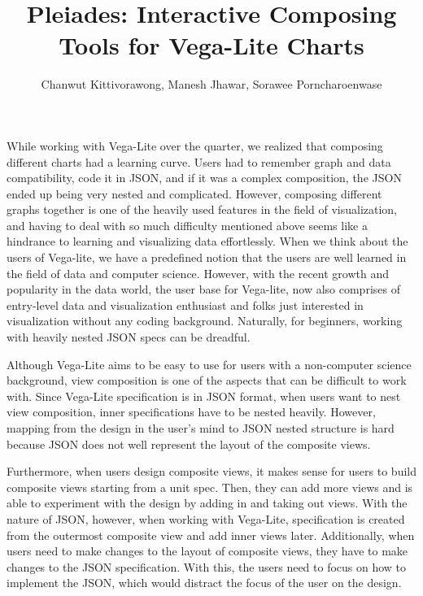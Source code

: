 \documentclass[journal]{vgtc}                %
\title{Pleiades: Interactive Composing Tools for Vega-Lite Charts}
\author{Chanwut Kittivorawong, Manesh Jhawar, Sorawee Porncharoenwase}
\begin{document}


\maketitle

While working with Vega-Lite over the quarter, we realized that composing
different charts had a learning curve. Users had to remember graph and data
compatibility, code it in JSON, and if it was a complex composition, the JSON
ended up being very nested and complicated. However, composing different graphs
together is one of the heavily used features in the field of visualization, and
having to deal with so much difficulty mentioned above seems like a hindrance to
learning and visualizing data effortlessly. When we think about the users of
Vega-lite, we have a predefined notion that the users are well learned in the
field of data and computer science. However, with the recent growth and popularity
in the data world, the user base for Vega-lite, now also comprises of entry-level
data and visualization enthusiast and folks just interested in visualization without
any coding background. Naturally, for beginners, working with heavily nested JSON
specs can be dreadful. 

Although Vega-Lite aims to be easy to use for users with a non-computer science
background, view composition is one of the aspects that can be difficult to work
with. Since Vega-Lite specification is in JSON format, when users
want to nest view composition, inner specifications have to be nested heavily.
However, mapping from the design in the user’s mind to JSON nested structure is
hard because JSON does not well represent the layout of the composite views.

Furthermore, when users design composite views, it makes sense for users to build
composite views starting from a unit spec. Then, they can add more views and is
able to experiment with the design by adding in and taking out views. With the
nature of JSON, however, when working with Vega-Lite, specification is created
from the outermost composite view and add inner views later. Additionally, when
users need to make changes to the layout of composite views, they have to make
changes to the JSON specification. With this, the users need to focus on how to
implement the JSON, which would distract the focus of the user on the design.
\end{document}
